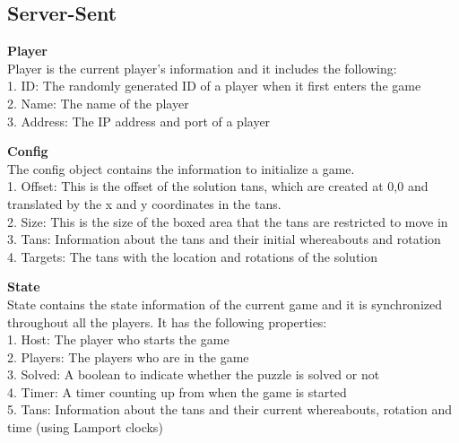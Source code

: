 \documentclass[twocolumn]{article}
\begin{document}
\subsection{Server-Sent}
\begin{flushleft}
\textbf{\large Player}\\
Player is the current player's information and it includes the following:\\
\hspace*{1em}1. ID: The randomly generated ID of a player when it first enters the game\\
\hspace*{1em}2. Name: The name of the player\\
\hspace*{1em}3. Address: The IP address and port of a player

\textbf{\large Config}\\
The config object contains the information to initialize a game.\\
\hspace*{1em}1. Offset: This is the offset of the solution tans, which are created at 0,0 and translated  by the x and y coordinates in the tans.\\
\hspace*{1em}2. Size: This is the size of the boxed area that the tans are restricted to move in\\
\hspace*{1em}3. Tans: Information about the tans and their initial whereabouts and rotation\\
\hspace*{1em}4. Targets: The tans with the location and rotations of the solution

\textbf{\large State}\\
State contains the state information of the current game and it is synchronized throughout all the players. It has the following properties:\\
\hspace*{1em}1. Host: The player who starts the game\\
\hspace*{1em}2. Players: The players who are in the game\\
\hspace*{1em}3. Solved: A boolean to indicate whether the puzzle is solved or not\\
\hspace*{1em}4. Timer: A timer counting up from when the game is started\\
\hspace*{1em}5. Tans: Information about the tans and their current whereabouts, rotation and time (using Lamport clocks)
\end{flushleft}
\end{document}
